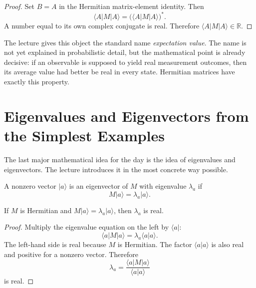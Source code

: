 \begin{proof}
Set \(B=A\) in the Hermitian matrix-element identity. Then
\begin{equation}
\langle A|M|A\rangle=\bigl(\langle A|M|A\rangle\bigr)^*.
\end{equation}
A number equal to its own complex conjugate is real. Therefore \(\langle A|M|A\rangle\in\mathbb{R}\).
\end{proof}

The lecture gives this object the standard name \emph{expectation value}. The name is not yet explained in probabilistic detail, but the mathematical point is already decisive: if an observable is supposed to yield real measurement outcomes, then its average value had better be real in every state. Hermitian matrices have exactly this property.

\section{Eigenvalues and Eigenvectors from the Simplest Examples}

The last major mathematical idea for the day is the idea of eigenvalues and eigenvectors. The lecture introduces it in the most concrete way possible.

\begin{definition}
A nonzero vector \(|a\rangle\) is an eigenvector of \(M\) with eigenvalue \(\lambda_a\) if
\begin{equation}
M|a\rangle=\lambda_a|a\rangle.
\end{equation}
\end{definition}

\begin{proposition}
If \(M\) is Hermitian and \(M|a\rangle=\lambda_a|a\rangle\), then \(\lambda_a\) is real.
\end{proposition}

\begin{proof}
Multiply the eigenvalue equation on the left by \(\langle a|\):
\begin{equation}
\langle a|M|a\rangle=\lambda_a\langle a|a\rangle.
\end{equation}
The left-hand side is real because \(M\) is Hermitian. The factor \(\langle a|a\rangle\) is also real and positive for a nonzero vector. Therefore
\begin{equation}
\lambda_a=\frac{\langle a|M|a\rangle}{\langle a|a\rangle}
\end{equation}
is real.
\end{proof}

